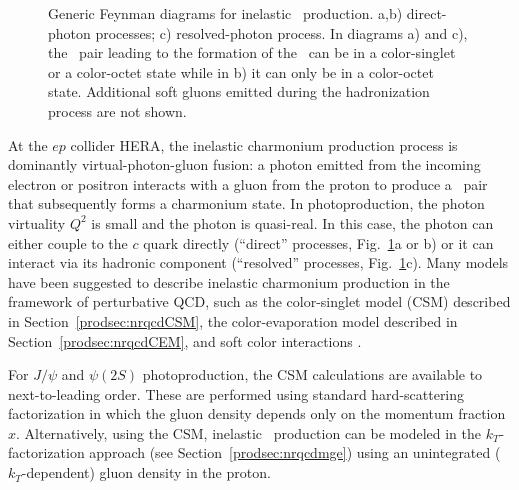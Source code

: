 \begin{figure}
\caption{Generic Feynman diagrams for inelastic \jpsi\ production.  a,b)
direct-photon processes; c) resolved-photon process. In diagrams
 a) and c), the \ccbar\ pair leading to the formation of the \jpsi\ can 
be in a color-singlet or a color-octet state while in b) it can
only be in a  color-octet state. Additional soft gluons emitted
during the  hadronization process are not shown.}
\label{herafeyn}
\end{figure}

At the $ep$ collider HERA, the inelastic charmonium production process
is dominantly virtual-photon-gluon fusion: a photon emitted from the
incoming electron or positron interacts with a gluon from the proton to
produce a \ccbar\ pair that subsequently forms a charmonium state.  In
photoproduction, the photon virtuality $Q^2$ is small and the photon is
quasi-real.  In this case, the photon can either couple to the $c$ quark
directly (``direct'' processes, Fig.~\ref{herafeyn}a or b) or it can
interact via its hadronic component (``resolved'' processes,
Fig.~\ref{herafeyn}c).
Many models have been suggested to describe inelastic charmonium
production in the framework of perturbative QCD, such as the 
color-singlet model
(CSM) \cite{Berger:1980ni,Baier:1981uk,Baier:1981zz,Baier:1983va}
described in Section~\ref{prodsec:nrqcdCSM}, the
color-evaporation model \cite{Halzen:1977rs,Eboli:1998xx} 
described in Section~\ref{prodsec:nrqcdCEM}, and soft
color interactions \cite{Edin:1997zb}.


For $J/\psi$ and $\psi(2S)$ photoproduction, the CSM calculations are
available to next-to-leading order\cite{Kramer:1994zi,Kramer:1995nb}. 
These are performed using standard 
hard-scattering factorization in which the gluon density 
depends only on the momentum fraction $x$.
Alternatively, using
the CSM, inelastic \jpsi\ production can be modeled in the
$k_T$-factorization approach (see Section~\ref{prodsec:nrqcdmge}) using
an unintegrated ($k_T$-dependent) gluon density in the proton.

